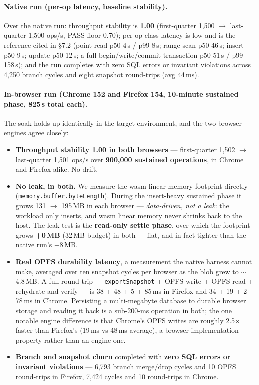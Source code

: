 \documentclass[11pt]{article}
\begin{document}
\paragraph{Native run (per-op latency, baseline stability).}
Over the native run: throughput stability is \textbf{1.00} (first-quarter 1,500
$\rightarrow$ last-quarter 1,500 ops/s, PASS floor 0.70); per-op-class latency is
low and is the reference cited in \S7.2 (point read p50 4\,\textmu s / p99
8\,\textmu s; range scan p50 46\,\textmu s; insert p50 9\,\textmu s; update p50
12\,\textmu s; a full begin/write/commit transaction p50 51\,\textmu s / p99
158\,\textmu s); and the run completes with zero SQL errors or invariant violations
across 4,250 branch cycles and eight snapshot round-trips (avg 44\,ms).

\paragraph{In-browser run (Chrome 152 and Firefox 154, 10-minute sustained phase,
825\,s total each).}
The soak holds up identically in the target environment, and the two browser engines
agree closely:

\begin{itemize}[leftmargin=1.5em,itemsep=0.35em]
\item \textbf{Throughput stability 1.00 in both browsers} --- first-quarter 1,502
$\rightarrow$ last-quarter 1,501 ops/s over \textbf{900,000 sustained operations},
in Chrome and Firefox alike. No drift.
\item \textbf{No leak, in both.} We measure the wasm linear-memory footprint
directly (\texttt{memory.buffer.\allowbreak byteLength}). During the insert-heavy sustained
phase it grows 131 $\rightarrow$ 195\,MB in each browser --- \emph{data-driven, not a
leak}: the workload only inserts, and wasm linear memory never shrinks back to the
host. The leak test is the \textbf{read-only settle phase}, over which the footprint
grows \textbf{+0\,MB} (32\,MB budget) in both --- flat, and in fact tighter than the
native run's +8\,MB.
\item \textbf{Real OPFS durability latency}, a measurement the native harness cannot
make, averaged over ten snapshot cycles per browser as the blob grew to
$\sim$4.8\,MB. A full round-trip --- \texttt{exportSnapshot} + OPFS write + OPFS read
+ rehydrate-and-verify --- is 38 + 48 + 5 + 85\,ms in Firefox and 34 + 19 + 2 +
78\,ms in Chrome. Persisting a multi-megabyte database to durable browser storage and
reading it back is a sub-200-ms operation in both; the one notable engine difference
is that Chrome's OPFS writes are roughly 2.5$\times$ faster than Firefox's (19\,ms vs
48\,ms average), a browser-implementation property rather than an engine one.
\item \textbf{Branch and snapshot churn} completed with \textbf{zero SQL errors or
invariant violations} --- 6,793 branch merge/drop cycles and 10 OPFS round-trips in
Firefox, 7,424 cycles and 10 round-trips in Chrome.
\end{itemize}
\end{document}
